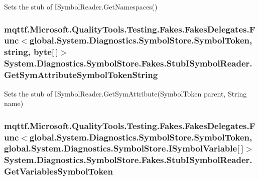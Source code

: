 Sets the stub of I\-Symbol\-Reader.\-Get\-Namespaces()

\hypertarget{class_system_1_1_diagnostics_1_1_symbol_store_1_1_fakes_1_1_stub_i_symbol_reader_ada7837a4249c9430fd5f90c98c42f5b2}{
\subsubsection[{Get\-Sym\-Attribute\-Symbol\-Token\-String}]{\setlength{\rightskip}{0pt plus 5cm}mqttf.\-Microsoft.\-Quality\-Tools.\-Testing.\-Fakes.\-Fakes\-Delegates.\-Func$<$global.\-System.\-Diagnostics.\-Symbol\-Store.\-Symbol\-Token, string, byte\mbox{[}$\,$\mbox{]}$>$ System.\-Diagnostics.\-Symbol\-Store.\-Fakes.\-Stub\-I\-Symbol\-Reader.\-Get\-Sym\-Attribute\-Symbol\-Token\-String}}\label{class_system_1_1_diagnostics_1_1_symbol_store_1_1_fakes_1_1_stub_i_symbol_reader_ada7837a4249c9430fd5f90c98c42f5b2}


Sets the stub of I\-Symbol\-Reader.\-Get\-Sym\-Attribute(\-Symbol\-Token parent, String name)

\hypertarget{class_system_1_1_diagnostics_1_1_symbol_store_1_1_fakes_1_1_stub_i_symbol_reader_ab83553b6062d5509f6504a338d151c9e}{
\subsubsection[{Get\-Variables\-Symbol\-Token}]{\setlength{\rightskip}{0pt plus 5cm}mqttf.\-Microsoft.\-Quality\-Tools.\-Testing.\-Fakes.\-Fakes\-Delegates.\-Func$<$global.\-System.\-Diagnostics.\-Symbol\-Store.\-Symbol\-Token, global.\-System.\-Diagnostics.\-Symbol\-Store.\-I\-Symbol\-Variable\mbox{[}$\,$\mbox{]}$>$ System.\-Diagnostics.\-Symbol\-Store.\-Fakes.\-Stub\-I\-Symbol\-Reader.\-Get\-Variables\-Symbol\-Token}}\label{class_system_1_1_diagnostics_1_1_symbol_store_1_1_fakes_1_1_stub_i_symbol_reader_ab83553b6062d5509f6504a338d151c9e}


